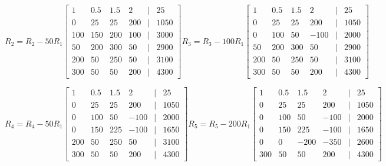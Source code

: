 \documentclass[11pt]{article}
\begin{document}
\begin{enumerate}
\begin{enumerate}
\[
    R_2 = R_2 - 50R_1
    \begin{bmatrix}
        1 & 0.5 & 1.5 & 2 &|& 25 \\
        0 & 25 & 25 & 200 &|& 1050 \\
        100 & 150 & 200 & 100 &|& 3000 \\
        50 & 200 & 300 & 50 &|& 2900 \\
        200 & 50 & 250 & 50 &|& 3100 \\
        300 & 50 & 50 & 200 &|& 4300
    \end{bmatrix}
    R_3 = R_3 - 100R_1
    \begin{bmatrix}
        1 & 0.5 & 1.5 & 2 &|& 25 \\
        0 & 25 & 25 & 200 &|& 1050 \\
        0 & 100 & 50 & -100 &|& 2000 \\
        50 & 200 & 300 & 50 &|& 2900 \\
        200 & 50 & 250 & 50 &|& 3100 \\
        300 & 50 & 50 & 200 &|& 4300
    \end{bmatrix}
\]

\[
    R_4 = R_4 - 50R_1
    \begin{bmatrix}
        1 & 0.5 & 1.5 & 2 &|& 25 \\
        0 & 25 & 25 & 200 &|& 1050 \\
        0 & 100 & 50 & -100 &|& 2000 \\
        0 & 150 & 225 & -100 &|& 1650 \\
        200 & 50 & 250 & 50 &|& 3100 \\
        300 & 50 & 50 & 200 &|& 4300
    \end{bmatrix}
    R_5 = R_5 - 200R_1
    \begin{bmatrix}
        1 & 0.5 & 1.5 & 2 &|& 25 \\
        0 & 25 & 25 & 200 &|& 1050 \\
        0 & 100 & 50 & -100 &|& 2000 \\
        0 & 150 & 225 & -100 &|& 1650 \\
        0 & 0 & -200 & -350 &|& 2600 \\
        300 & 50 & 50 & 200 &|& 4300
    \end{bmatrix}
\]


\end{enumerate}
\end{enumerate}
\end{document}
